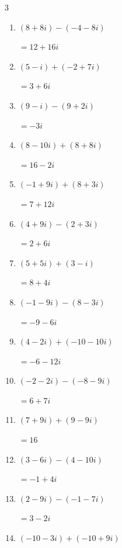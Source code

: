 \begin{multicols}{3}
\begin{enumerate}
  \item $\displaystyle (8+8i) - (-4-8i)$

        $\displaystyle =12+16i$

  \item $\displaystyle (5-i) + (-2+7i)$

        $\displaystyle =3+6i$

  \item $\displaystyle (9-i) - (9+2i)$

        $\displaystyle =-3i$

  \item $\displaystyle (8-10i) + (8+8i)$

        $\displaystyle =16-2i$

  \item $\displaystyle (-1+9i) + (8+3i)$

        $\displaystyle =7+12i$

  \item $\displaystyle (4+9i) - (2+3i)$

        $\displaystyle =2+6i$

  \item $\displaystyle (5+5i) + (3-i)$

        $\displaystyle =8+4i$

  \item $\displaystyle (-1-9i) - (8-3i)$

        $\displaystyle =-9-6i$

  \item $\displaystyle (4-2i) + (-10-10i)$

        $\displaystyle =-6-12i$

\columnbreak %

  \item $\displaystyle (-2-2i) - (-8-9i)$

        $\displaystyle =6+7i$

  \item $\displaystyle (7+9i) + (9-9i)$

        $\displaystyle =16$

  \item $\displaystyle (3-6i) - (4-10i)$

        $\displaystyle =-1+4i$

  \item $\displaystyle (2-9i) - (-1-7i)$

        $\displaystyle =3-2i$

  \item $\displaystyle (-10-3i) + (-10+9i)$


\end{enumerate}
\end{multicols}
